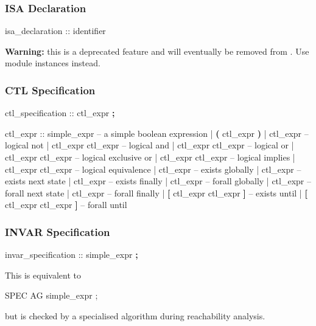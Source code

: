 \subsubsection{ISA Declaration}
\begin{Grammar}
isa_declaration ::  identifier
\end{Grammar}

\textbf{Warning:} this is a deprecated feature and will eventually be removed from \nusmv. Use module instances instead.


\subsubsection{CTL Specification}
\begin{Grammar}
ctl_specification ::  ctl_expr \textbf{;}
\end{Grammar}

\begin{Grammar}
ctl_expr ::
    simple_expr                 -- a simple boolean expression
    | \textbf{(} ctl_expr \textbf{)}
    | \operator{!} ctl_expr                -- logical not
    | ctl_expr \operator{\&} ctl_expr       -- logical and
    | ctl_expr \operator{|} ctl_expr       -- logical or
    | ctl_expr  ctl_expr     -- logical exclusive or
    | ctl_expr \operator{->} ctl_expr      -- logical implies
    | ctl_expr \operator{<->} ctl_expr     -- logical equivalence
    |  ctl_expr               -- exists globally
    |  ctl_expr               -- exists next state
    |  ctl_expr               -- exists finally
    |  ctl_expr               -- forall globally
    |  ctl_expr               -- forall next state
    |  ctl_expr               -- forall finally
    |  \textbf{[} ctl_expr  ctl_expr \textbf{]} -- exists until
    |  \textbf{[} ctl_expr  ctl_expr \textbf{]} -- forall until
\end{Grammar}


\subsubsection{INVAR Specification}
\begin{Grammar}
invar_specification ::  simple_expr \textbf{;}
\end{Grammar}

This is equivalent to 
%
\begin{Grammar}
SPEC  AG simple_expr ;
\end{Grammar}
%
but is checked by a specialised algorithm during reachability analysis.


